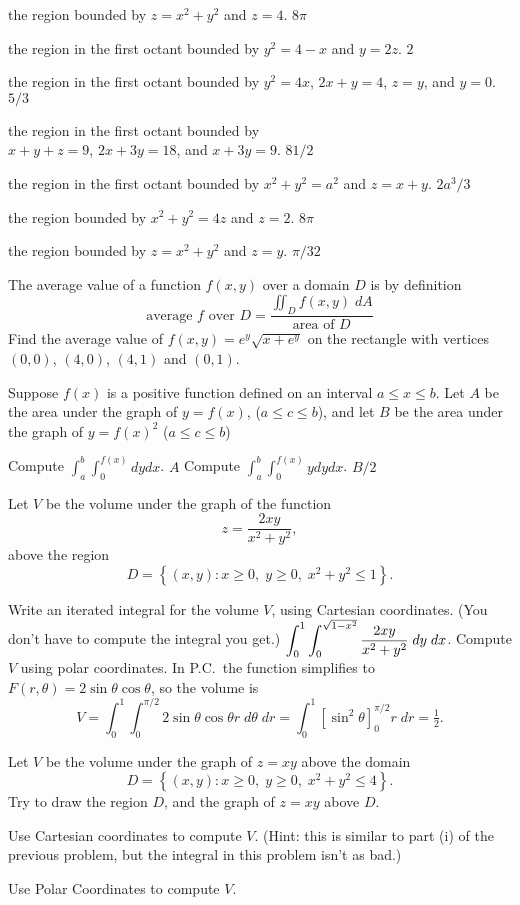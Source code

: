 \subprob the region bounded by $z=x^2+y^2$ and $z=4$. 
\answer
$8\pi$
\endanswer


\subprob the region in the first octant 
bounded by $y^2=4-x$ and $y=2z$.
\answer
$2$
\endanswer


\subprob the region in the first octant 
bounded by $y^2=4x$, $2x+y=4$, $z=y$,
and $y=0$.
\answer
$5/3$
\endanswer

\subprob the region in the first octant 
bounded by\\
$x+y+z=9$, $2x+3y=18$, and $x+3y=9$.
\answer
$81/2$
\endanswer

\subprob the region in the first octant 
bounded by $x^2+y^2=a^2$ and $z=x+y$.
\answer
$2a^3/3$
\endanswer

\subprob the region bounded by $x^2+y^2=4z$ and $z=2$. 
\answer
$8\pi$
\endanswer

\subprob the region bounded by $z=x^2+y^2$ and $z=y$. 
\answer
$\pi/32$
\endanswer

\begin{multicols}{2}
\problem The average value of a function $f(x, y)$
over a domain $D$ is by definition
\[
\text{average $f$ over $D$}
=
\frac{\iint_D f(x, y) \;  dA}{\text{area of }D}
\]
Find the average value of $f(x,y)=e^y\sqrt{x+e^y}$ on the rectangle
with vertices $(0,0)$, $(4,0)$, $(4,1)$ and $(0,1)$.

\problem Suppose $f(x)$ is a positive function defined on an interval 
$a\le x\le b$.  
Let $A$ be the area under the graph of $y=f(x)$, ($a\le c\le b$), and
let $B$ be the area under the graph of $y=f(x)^2$ ($a\le c\le b$)

\subprob Compute $\int_a^b \int_0^{f(x)} dy dx$. 
\answer
$A$
\endanswer
\subprob Compute $\int_a^b \int_0^{f(x)} ydy dx$. 
\answer
$B/2$
\endanswer

\problem Let $V$ be the volume under the graph of the function 
\[
z=\frac{2xy}{x^2+y^2},
\]
above the region 
\[
D = \left\{ (x, y) : x\ge0,\;  y\ge0,\; x^2+y^2\le1 \right\}.
\]

\subprob Write an iterated integral for the volume $V$, using 
Cartesian coordinates.  (You don't have to compute the integral you
get.)
\answer
$\displaystyle\int_0^1 \int_0^{\sqrt{1-x^2}} \frac{2xy}{x^2+y^2}\; dy\; dx$.
\endanswer
\subprob Compute $V$ using polar coordinates. 
\answer
In P.C.\ the function simplifies to $F(r,\theta) = 2\sin \theta\cos
\theta$, so the volume is
\[
V = \int_0^1 \int_0^{\pi/2} 2\sin\theta\cos\theta r\; d\theta\; dr
=\int_0^1 \left[ \sin^2\theta \right]_0^{\pi/2} r\; dr
=\tfrac12.
\]
\endanswer

\problem  Let $V$ be the volume 
under the graph of $z=xy$ above the domain
\[
D = \left\{ (x, y) : x\ge0,\;  y\ge0,\; x^2+y^2\le 4 \right\}.
\]
Try to draw the region $D$, and the graph of $z=xy$ above $D$.

\subprob Use Cartesian coordinates to compute $V$. 
(Hint: this is similar to part \textsf{(i)} of the previous problem,
but the integral in this problem isn't as bad.)

\subprob Use Polar Coordinates to compute $V$.  
\end{multicols}
\noproblemfont


